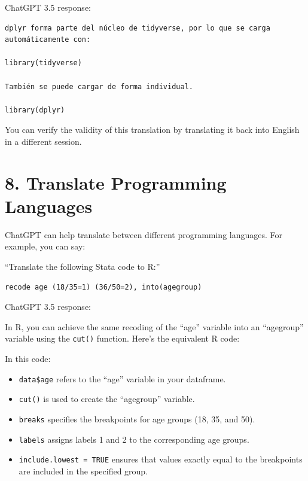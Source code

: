 \documentclass[
  letterpaper,
  DIV=11,
  numbers=noendperiod]{scrreprt}
\newenvironment{Shaded}{\begin{snugshade}}{\end{snugshade}}
\newcommand{\AttributeTok}[1]{\textcolor[rgb]{0.40,0.45,0.13}{#1}}
\newcommand{\ConstantTok}[1]{\textcolor[rgb]{0.56,0.35,0.01}{#1}}
\newcommand{\DecValTok}[1]{\textcolor[rgb]{0.68,0.00,0.00}{#1}}
\newcommand{\DocumentationTok}[1]{\textcolor[rgb]{0.37,0.37,0.37}{\textit{#1}}}
\newcommand{\FunctionTok}[1]{\textcolor[rgb]{0.28,0.35,0.67}{#1}}
\newcommand{\NormalTok}[1]{\textcolor[rgb]{0.00,0.23,0.31}{#1}}
\newcommand{\OtherTok}[1]{\textcolor[rgb]{0.00,0.23,0.31}{#1}}
\newcommand{\SpecialCharTok}[1]{\textcolor[rgb]{0.37,0.37,0.37}{#1}}
\providecommand{\tightlist}{%
  \setlength{\itemsep}{0pt}\setlength{\parskip}{0pt}}\usepackage{longtable,booktabs,array}
\begin{document}
ChatGPT 3.5 response:

\label{chatgpt}
\begin{verbatim}
dplyr forma parte del núcleo de tidyverse, por lo que se carga automáticamente con:

library(tidyverse)

También se puede cargar de forma individual.

library(dplyr)
\end{verbatim}

You can verify the validity of this translation by translating it back
into English in a different session.

\section{8. Translate Programming
Languages}\label{translate-programming-languages}

ChatGPT can help translate between different programming languages. For
example, you can say:

``Translate the following Stata code to R:''

\begin{verbatim}
recode age (18/35=1) (36/50=2), into(agegroup)
\end{verbatim}

ChatGPT 3.5 response:

\label{chatgpt}
In R, you can achieve the same recoding of the ``age'' variable into an
``agegroup'' variable using the \texttt{cut()} function. Here's the
equivalent R code:

\begin{Shaded}
\end{Shaded}

In this code:

\begin{itemize}
\tightlist
\item
  \texttt{data\$age} refers to the ``age'' variable in your dataframe.
\item
  \texttt{cut()} is used to create the ``agegroup'' variable.
\item
  \texttt{breaks} specifies the breakpoints for age groups (18, 35, and
  50).
\item
  \texttt{labels} assigns labels 1 and 2 to the corresponding age
  groups.
\item
  \texttt{include.lowest\ =\ TRUE} ensures that values exactly equal to
  the breakpoints are included in the specified group.
\end{itemize}
\end{document}
